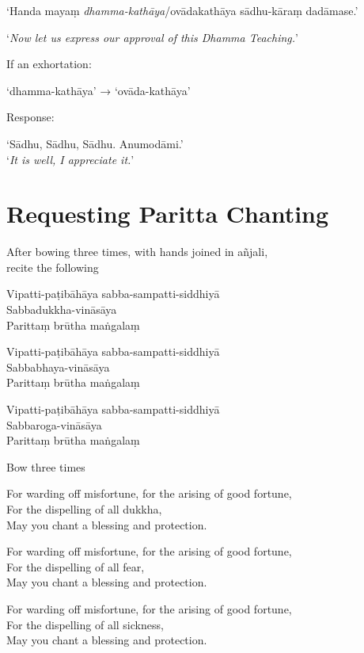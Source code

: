 ‘Handa mayaṃ \emph{dhamma-kathāya}/ovādakathāya sādhu-kāraṃ dadāmase.’

‘\emph{Now let us express our approval of this Dhamma Teaching.}’

If an exhortation:

‘dhamma-kathāya’ → ‘ovāda-kathāya’

Response:

‘Sādhu, Sādhu, Sādhu. Anumodāmi.’\\
‘\emph{It is well, I appreciate it.}’

\section{Requesting Paritta Chanting}

\begin{instruction}
  After bowing three times, with hands joined in añjali,\\
  recite the following
\end{instruction}

Vipatti-paṭibāhāya sabba-sampatti-siddhiyā\\
Sabbadukkha-vināsāya\\
Parittaṃ brūtha maṅgalaṃ

Vipatti-paṭibāhāya sabba-sampatti-siddhiyā\\
Sabbabhaya-vināsāya\\
Parittaṃ brūtha maṅgalaṃ

Vipatti-paṭibāhāya sabba-sampatti-siddhiyā\\
Sabbaroga-vināsāya\\
Parittaṃ brūtha maṅgalaṃ

\begin{instruction}
  Bow three times
\end{instruction}

\begin{english}
For warding off misfortune, for the arising of good fortune,\\
For the dispelling of all dukkha,\\
May you chant a blessing and protection.

For warding off misfortune, for the arising of good fortune,\\
For the dispelling of all fear,\\
May you chant a blessing and protection.

For warding off misfortune, for the arising of good fortune,\\
For the dispelling of all sickness,\\
May you chant a blessing and protection.
\end{english}


